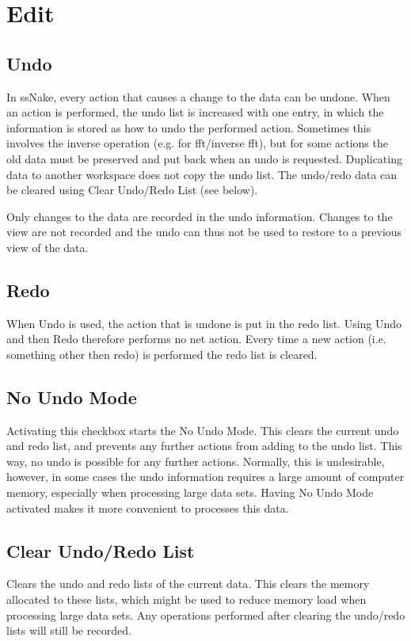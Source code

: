 \documentclass[11pt,a4paper]{article}
\begin{document}
\section{Edit}
\subsection{Undo}
In ssNake, every action that causes a change to the data can be undone. When an action is performed, the undo list is increased with one entry, in which the information is stored as how to undo the performed action. Sometimes this involves the inverse operation (e.g. for fft/inverse fft), but for some actions the old data must be preserved and put back when an undo is requested. Duplicating data to another workspace does not copy the undo list. The undo/redo data can be cleared using Clear Undo/Redo List (see below).

Only changes to the data are recorded in the undo information.
Changes to the view are not recorded and the undo can thus not be used to restore to a previous view of the data.

\subsection{Redo}
When Undo is used, the action that is undone is put in the redo list. Using Undo and then Redo therefore performs no net action.
Every time a new action (i.e. something other then redo) is performed the redo list is cleared.

\subsection{No Undo Mode}
Activating this checkbox starts the No Undo Mode. This clears the current undo and redo list, and prevents any further actions from adding to the undo list. This way, no undo is possible for any further actions. Normally, this is undesirable, however, in some cases the undo information requires a large amount of computer memory, especially when processing large data sets.
Having No Undo Mode activated makes it more convenient to processes this data.

\subsection{Clear Undo/Redo List}
Clears the undo and redo lists of the current data. This clears the memory allocated to these lists, which might be used to reduce memory load when processing large data sets.
Any operations performed after clearing the undo/redo lists will still be recorded.
\end{document}
